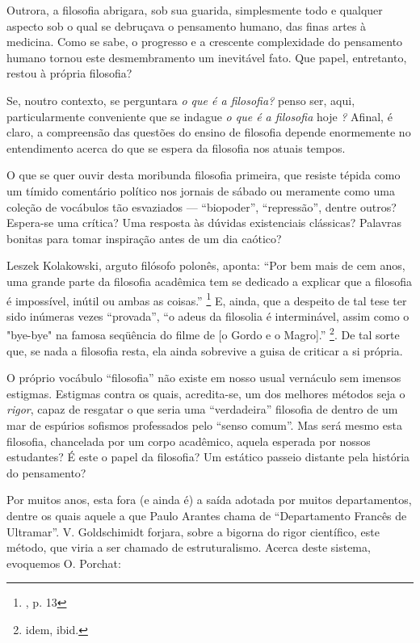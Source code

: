 \documentclass[12pt,a4paper]{article}
\begin{document}
	Outrora, a filosofia abrigara, sob sua guarida, simplesmente todo e 
	qualquer aspecto sob o qual se debruçava o pensamento humano, das 
	finas artes à medicina. Como se sabe, o progresso e a crescente 
	complexidade do pensamento humano tornou este desmembramento um 
	inevitável fato. Que papel, entretanto, restou à própria filosofia? 

	Se, noutro contexto, se perguntara \textit{o que é a filosofia?} 
	penso ser, aqui, particularmente conveniente que se indague 
	\textit{o que é a filosofia} hoje \textit{?} Afinal, é claro, 
	a compreensão das questões do ensino de filosofia depende 
	enormemente no entendimento acerca do que se espera da filosofia 
	nos atuais tempos. 

	O que se quer ouvir desta moribunda filosofia primeira, que 
	resiste tépida como um tímido comentário político nos jornais de 
	sábado ou meramente como uma coleção de vocábulos tão esvaziados 
	--- “biopoder”, “repressão”, dentre outros? Espera-se uma crítica? 
	Uma resposta às dúvidas existenciais clássicas? Palavras bonitas 
	para tomar inspiração antes de um dia caótico? 

	Leszek Kolakowski, arguto filósofo polonês, aponta: “Por bem mais 
	de cem anos, uma grande parte da filosofia acadêmica tem se 
	dedicado a explicar que a filosofia é impossível, inútil ou 
	ambas as coisas.” \footnote{\cite{lkmeta}, p. 13}
	E, ainda, que a despeito de tal tese ter sido 
	inúmeras vezes “provada”, “o adeus da filosolia é interminável, assim 
	como o "bye-bye" na famosa seqüência do filme de [o Gordo e o Magro].”
	\footnote{idem, ibid.}. De tal sorte que, se nada a filosofia 
	resta, ela ainda sobrevive a guisa de criticar a si própria. 

	O próprio vocábulo “filosofia” não existe em nosso usual vernáculo 
	sem imensos estigmas. Estigmas contra os quais, acredita-se, um 
	dos melhores métodos seja o \textit{rigor}, capaz de resgatar o que 
	seria uma “verdadeira” filosofia de dentro de um mar de espúrios 
	sofismos professados pelo “senso comum”. Mas será mesmo esta 
	filosofia, chancelada por um corpo acadêmico, aquela esperada 
	por nossos estudantes? É este o papel da filosofia? Um estático 
	passeio distante pela história do pensamento? 

	Por muitos anos, esta fora (e ainda é) a saída adotada por 
	muitos departamentos, dentre os quais aquele a que Paulo Arantes 
	chama de “Departamento Francês de Ultramar”. V. Goldschimidt 
	forjara, sobre a bigorna do rigor científico, este método, 
	que viria a ser chamado de estruturalismo. Acerca deste sistema, 
	evoquemos O. Porchat: 
\end{document}
